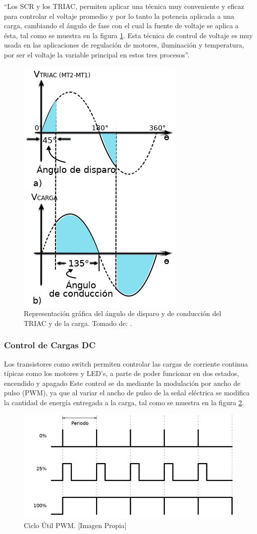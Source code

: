 ``Los SCR y los TRIAC, permiten aplicar una técnica muy conveniente y eficaz para controlar el voltaje promedio y por lo tanto la potencia aplicada a una carga, cambiando el ángulo de fase con el cual la fuente de voltaje se aplica a ésta, tal como se muestra en la figura \ref{fig:triacgraph}. Esta técnica de control de voltaje es muy usada en las aplicaciones de regulación de motores, iluminación y temperatura, por ser el voltaje la variable principal en estos tres procesos''.\cite{CEKIT}\\


\begin{figure}[!t]
	\centering
	\caption{Representación gráfica del ángulo de disparo y de conducción del TRIAC y de la carga. Tomado de: \cite{CEKIT}.}
	\label{fig:triacgraph}
	\includegraphics[width=0.4\linewidth]{Imagenes/TRIAC_graph}
\end{figure}

\subsubsection{Control de Cargas DC}

Los transistores como switch permiten controlar las cargas de corriente continua típicas como los motores y LED's, a parte de poder funcionar en dos estados, encendido y apagado Este control se da mediante la modulación por ancho de pulso (PWM), ya que al variar el ancho de pulso de la señal eléctrica se modifica la cantidad de energía entregada a la carga, tal como se muestra en la figura \ref{fig:pwm-duty-800x396}. \cite{PWM}\\

\begin{figure}[!t]
	\centering
	\caption{Ciclo Útil PWM. [Imagen Propia] }
	\label{fig:pwm-duty-800x396}
	\includegraphics[width=0.6\linewidth]{Imagenes/pwm}
\end{figure}

